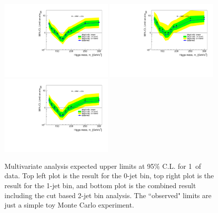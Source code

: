 \begin{figure}[!htbp]
\begin{center}
   \includegraphics[width=0.49\textwidth]{figures/limits_0j_1000pb_mva_1.pdf}
   \includegraphics[width=0.49\textwidth]{figures/limits_1j_1000pb_mva_1.pdf}
   \includegraphics[width=0.49\textwidth]{figures/limits_nj_1000pb_mva_1.pdf}
   \caption{Multivariate analysis expected upper limits at 95\% C.L. for 1\ifb\ of data. Top left plot 
   is the result for the 0-jet bin, top right plot is the result for the 1-jet bin, and 
   bottom plot is the combined result including the cut based 2-jet bin analysis. The ``observed" limits 
   are just a simple toy Monte Carlo experiment.}
   \label{fig:mvabase_uls}
\end{center}
\end{figure}
